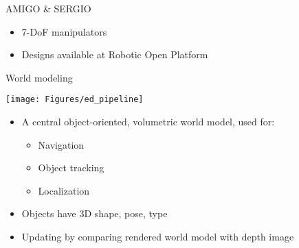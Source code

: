 \documentclass[a4paper,12pt]{article}
\newcommand{\emptylogo}{\texttt{[image: Figures/Empty]}}
\begin{document}
\begin{slidetop}
\begin{multicols}{2}
\begin{bclogo}[couleur = white, arrondi = 0.25, couleurBord = tuedarkblue, epBarre = 0, logo=\emptylogo]{\textcolor{tuedarkblue}{AMIGO \& SERGIO}}
\begin{itemize}[itemsep = 0pt, parsep = 0pt, leftmargin=15pt]
\begin{itemize}[itemsep = 0pt, parsep = 0pt, leftmargin=15pt]
    	\end{itemize}
        \item 7-DoF manipulators
        \item Designs available at Robotic Open Platform
    \end{itemize}
\end{bclogo}
\vspace{0.2cm}
\begin{bclogo}[couleur = white, arrondi = 0.25, couleurBord = tuedarkblue, epBarre = 0, logo=\emptylogo]{\textcolor{tuedarkblue}{World modeling}}
\bigskip
\begin{center}
	\texttt{[image: Figures/ed\_pipeline]}
\end{center}
\begin{itemize}[itemsep = 0pt, parsep = 0pt, leftmargin=15pt]
	\item A central object-oriented, volumetric world model, used for:	
	\begin{itemize}[itemsep = 0pt, parsep = 0pt, leftmargin=15pt]
		\item Navigation
		\item Object tracking
		\item Localization
	\end{itemize}
	\item Objects have 3D shape, pose, type
	\item Updating by comparing rendered world model with depth image
\end{itemize}
\end{bclogo}


\end{multicols}
\end{slidetop}
\end{document}
